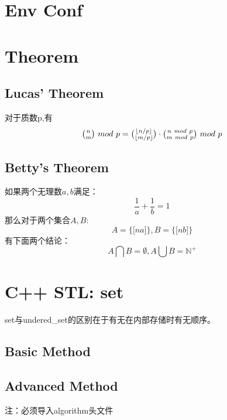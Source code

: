 \documentclass[10pt,UTF8,a4paper,twoside]{ctexart}
\begin{document}
\begin{multicols}{2}

\begin{appendices}
	\section{Env Conf}
		
		
		
		
		
	
	\section{Theorem}
		\large
		\subsection{Lucas' Theorem}
			对于质数p,有
			$$
				\tbinom{n}{m} \ mod \ p = \tbinom{\lfloor n/p \rfloor}{\lfloor m/p \rfloor}
				\cdot \tbinom{n \ mod \ p}{m \ mod \ p} \ mod \ p
			$$
		\subsection{Betty's Theorem}
			如果两个无理数$a,b$满足：
			$$ \frac{1}{a}+\frac{1}{b}=1$$
			那么对于两个集合$A,B$:
			$$A=\lbrace \lbrack na \rbrack \rbrace,B=\lbrace \lbrack nb \rbrack \rbrace$$
			有下面两个结论：
			$$A \bigcap B = \emptyset,A \bigcup B = \mathbb{N}^+$$
	\section{C++ STL: set}
		\large
		set与undered\_set的区别在于有无在内部存储时有无顺序。
		\subsection{Basic Method}
			
		\subsection{Advanced Method}
			注：必须导入algorithm头文件
			
		
\end{appendices}

\end{multicols}
\end{document}
